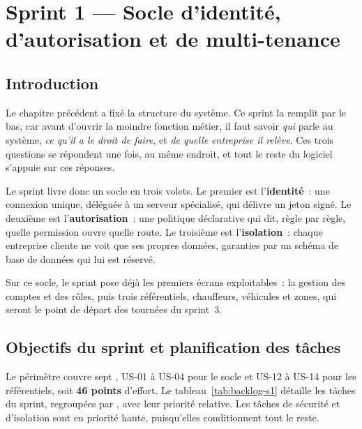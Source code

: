 %
\chapter{Sprint 1 — Socle d'identité, d'autorisation et de multi-tenance}
\label{ch:socle}

\section{Introduction}

Le chapitre précédent a fixé la structure du système. Ce sprint la remplit par le bas, car avant
d'ouvrir la moindre fonction métier, il faut savoir \emph{qui} parle au système, \emph{ce qu'il a le
droit de faire}, et \emph{de quelle entreprise il relève}. Ces trois questions se répondent une fois,
au même endroit, et tout le reste du logiciel s'appuie sur ces réponses.

Le sprint livre donc un socle en trois volets. Le premier est l'\textbf{identité}~: une connexion
unique, déléguée à un serveur spécialisé, qui délivre un jeton signé. Le deuxième est
l'\textbf{autorisation}~: une politique déclarative qui dit, règle par règle, quelle permission
ouvre quelle route. Le troisième est l'\textbf{isolation}~: chaque entreprise cliente ne voit que
ses propres données, garanties par un schéma de base de données qui lui est réservé.

Sur ce socle, le sprint pose déjà les premiers écrans exploitables~: la gestion des comptes et des
rôles, puis trois référentiels, chauffeurs, véhicules et zones, qui seront le point de départ des
tournées du sprint~3.

\section{Objectifs du sprint et planification des tâches}

Le périmètre couvre sept , US-01 à US-04 pour le socle et US-12 à US-14 pour les
référentiels, soit \textbf{46 points} d'effort. Le tableau~\ref{tab:backlog-s1} détaille les tâches
du sprint, regroupées par , avec leur priorité relative. Les tâches de sécurité et
d'isolation sont en priorité haute, puisqu'elles conditionnent tout le reste.

